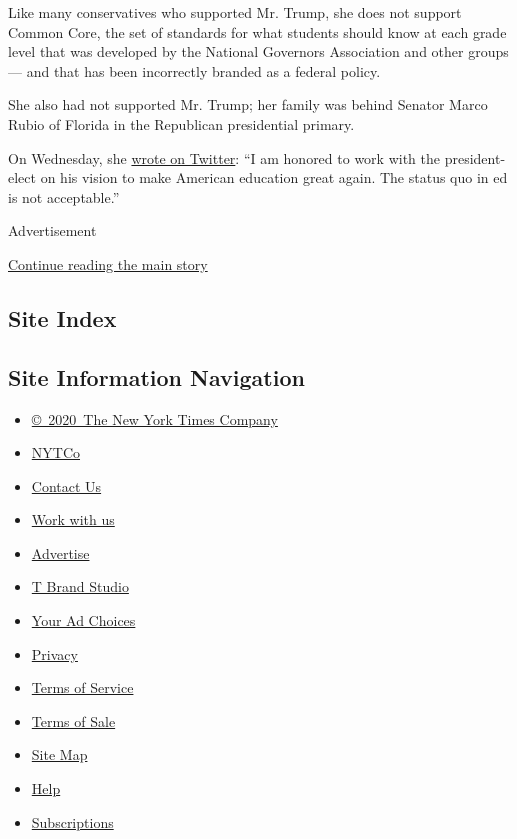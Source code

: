 Like many conservatives who supported Mr. Trump, she does not support
Common Core, the set of standards for what students should know at each
grade level that was developed by the National Governors Association and
other groups --- and that has been incorrectly branded as a federal
policy.

She also had not supported Mr. Trump; her family was behind Senator
Marco Rubio of Florida in the Republican presidential primary.

On Wednesday, she
\href{https://twitter.com/BetsyDeVos/status/801489110984691712}{wrote on
Twitter}: ``I am honored to work with the president-elect on his vision
to make American education great again. The status quo in ed is not
acceptable.''

Advertisement

\protect\hyperlink{after-bottom}{Continue reading the main story}

\hypertarget{site-index}{%
\subsection{Site Index}\label{site-index}}

\hypertarget{site-information-navigation}{%
\subsection{Site Information
Navigation}\label{site-information-navigation}}

\begin{itemize}
\tightlist
\item
  \href{https://help.nytimes.com/hc/en-us/articles/115014792127-Copyright-notice}{©~2020~The
  New York Times Company}
\end{itemize}

\begin{itemize}
\tightlist
\item
  \href{https://www.nytco.com/}{NYTCo}
\item
  \href{https://help.nytimes.com/hc/en-us/articles/115015385887-Contact-Us}{Contact
  Us}
\item
  \href{https://www.nytco.com/careers/}{Work with us}
\item
  \href{https://nytmediakit.com/}{Advertise}
\item
  \href{http://www.tbrandstudio.com/}{T Brand Studio}
\item
  \href{https://www.nytimes.com/privacy/cookie-policy\#how-do-i-manage-trackers}{Your
  Ad Choices}
\item
  \href{https://www.nytimes.com/privacy}{Privacy}
\item
  \href{https://help.nytimes.com/hc/en-us/articles/115014893428-Terms-of-service}{Terms
  of Service}
\item
  \href{https://help.nytimes.com/hc/en-us/articles/115014893968-Terms-of-sale}{Terms
  of Sale}
\item
  \href{https://spiderbites.nytimes.com}{Site Map}
\item
  \href{https://help.nytimes.com/hc/en-us}{Help}
\item
  \href{https://www.nytimes.com/subscription?campaignId=37WXW}{Subscriptions}
\end{itemize}
